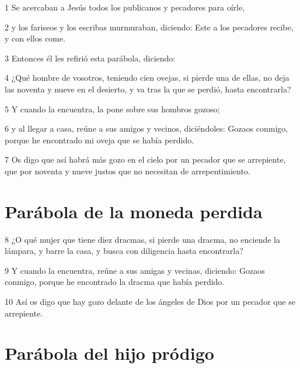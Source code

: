 \par 1 Se acercaban a Jesús todos los publicanos y pecadores para oírle,
\par 2 y los fariseos y los escribas murmuraban, diciendo: Este a los pecadores recibe, y con ellos come.
\par 3 Entonces él les refirió esta parábola, diciendo:
\par 4 ¿Qué hombre de vosotros, teniendo cien ovejas, si pierde una de ellas, no deja las noventa y nueve en el desierto, y va tras la que se perdió, hasta encontrarla?
\par 5 Y cuando la encuentra, la pone sobre sus hombros gozoso;
\par 6 y al llegar a casa, reúne a sus amigos y vecinos, diciéndoles: Gozaos conmigo, porque he encontrado mi oveja que se había perdido.
\par 7 Os digo que así habrá más gozo en el cielo por un pecador que se arrepiente, que por noventa y nueve justos que no necesitan de arrepentimiento.

\section*{Parábola de la moneda perdida}

\par 8 ¿O qué mujer que tiene diez dracmas, si pierde una dracma, no enciende la lámpara, y barre la casa, y busca con diligencia hasta encontrarla?
\par 9 Y cuando la encuentra, reúne a sus amigas y vecinas, diciendo: Gozaos conmigo, porque he encontrado la dracma que había perdido.
\par 10 Así os digo que hay gozo delante de los ángeles de Dios por un pecador que se arrepiente.

\section*{Parábola del hijo pródigo}

